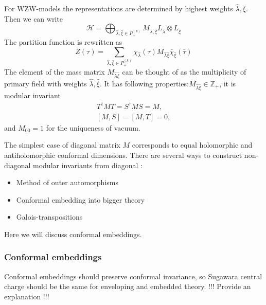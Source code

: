 \documentclass[a4paper,12pt]{article}
\theoremstyle{definition} \newtheorem{Def}{Definition}
\begin{document}
For WZW-models the representations are determined by highest weights $\hat \lambda, \hat \xi$. Then we can write
\begin{equation}
  \label{eq:105}
  \mathcal{H}=\bigoplus_{\hat \lambda,\hat \xi\in P^{(k)}_{+}}M_{\hat \lambda,\hat \xi} L_{\hat \lambda}\otimes L_{\hat \xi}
\end{equation}
The partition function is rewritten as
\begin{equation}
  \label{eq:106}
  Z(\tau)=\sum_{\hat \lambda,\hat \xi\in P^{(k)}_{+}} \chi_{\hat \lambda}(\tau)M_{\hat \lambda\hat\xi}\bar \chi_{\hat \xi}(\bar \tau)
\end{equation}
The element of the mass matrix $M_{\hat \lambda\hat\xi}$ can be thought of as the multiplicity of primary field with weights $\hat\lambda,\hat \xi$. It has following properties:$M_{\hat \lambda\hat\xi}\in \mathbb{Z}_+$, it is modular invariant
\begin{equation}
  \label{eq:108}
  \begin{aligned}
    T^{\dagger}MT=S^{\dagger}MS=M,\\
    [M,S]=[M,T]=0,
  \end{aligned}
\end{equation}
and $M_{00}=1$ for the uniqueness of vacuum. 

The simplest case of diagonal matrix $M$ corresponds to equal holomorphic and antiholomorphic conformal dimensions. There are several ways to construct non-diagonal modular invariants from diagonal \cite{difrancesco1997cft}:
\begin{itemize}
\item Method of outer automorphisms
\item Conformal embedding into bigger theory
\item Galois-transpositions
\end{itemize}
Here we will discuss conformal embeddings.

\subsubsection{Conformal embeddings}
\label{sec:conformal-embeddings}
Conformal embeddings should preserve conformal invariance, so Sugawara central charge should be the same for enveloping and embedded theory. !!! Provide an explanation !!!
\end{document}
